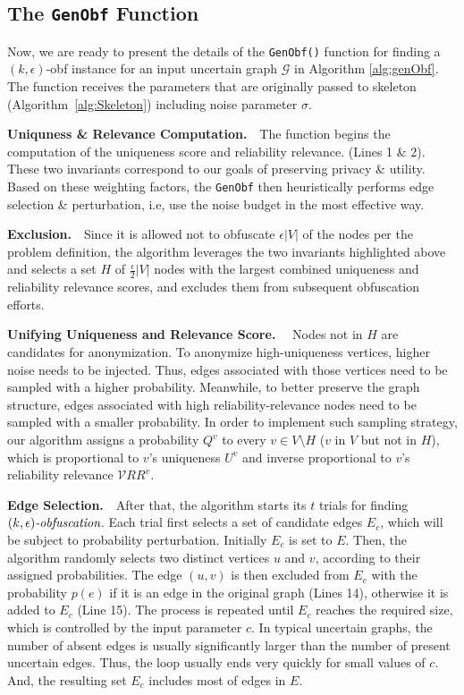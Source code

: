 \subsection{The \texttt{GenObf} Function}

Now, we are ready to present the details of the  \texttt{GenObf()} function for finding 
a $(k,\epsilon)$-obf instance for an input uncertain graph $\mathcal{G}$ in Algorithm \ref{alg:genObf}. The function receives the parameters that are originally passed to \SysName skeleton (Algorithm~\ref{alg:Skeleton}) including noise parameter $\sigma$.  



\textbf{Uniquness \& Relevance Computation.}~~The function begins the computation of the uniqueness score and reliability relevance. (Lines 1 \& 2).
These two invariants correspond to our goals of preserving privacy \& utility.   
Based on these weighting factors, the \texttt{GenObf} then heuristically performs edge selection \& perturbation, i.e, use the noise budget in the most effective way. 


\textbf{Exclusion.}~~Since it is allowed not to obfuscate $\epsilon|V|$ of the nodes per the problem definition, the algorithm leverages the two invariants highlighted above and selects a set $H$ of $\frac{\epsilon}{2}|V|$ nodes with the largest combined uniqueness and reliability relevance scores, and excludes them from subsequent obfuscation efforts. 



\textbf{Unifying Uniqueness and Relevance Score.}~~
Nodes not in $H$ are candidates for anonymization. 
To anonymize high-uniqueness vertices, higher noise needs to be injected. Thus, edges associated with those vertices need to be sampled with a higher probability. Meanwhile, to better preserve the graph structure, edges associated with high reliability-relevance nodes need to be sampled with a smaller probability.
In order to implement such sampling strategy, our algorithm assigns a probability $Q^{v}$ to every $v \in V \setminus H$ ($v$ in $V$ but not in $H$), 
which is proportional to $v$'s uniqueness $U^{v}$ and inverse proportional to $v$'s reliability relevance $\mathcal{V}RR^{v}$. 

 

\textbf{Edge Selection.}~~After that, the algorithm starts its $t$ trials for finding $\textit{$(k,\epsilon)$-obfuscation}$. Each trial first selects a set of candidate edges $E_{c}$, which will be subject to probability perturbation.
Initially $E_{c}$ is set to $E$. Then, the algorithm randomly selects two distinct vertices $u$ and $v$, according to their assigned probabilities. 
The edge $(u,v)$ is then excluded from $E_{c}$ with the probability $p(e)$ if it is an edge in the original graph (Lines 14), 
otherwise it is added to $E_{c}$ (Line 15).  
The process is repeated until $E_{c}$ reaches the required size, which is controlled by the input parameter $c$.
In typical uncertain graphs, the number of absent edges is usually significantly larger than the number of present uncertain edges. 
Thus, the loop usually ends very quickly for small values of $c$. And, the resulting set $E_{c}$ includes most of edges in $E$. 

